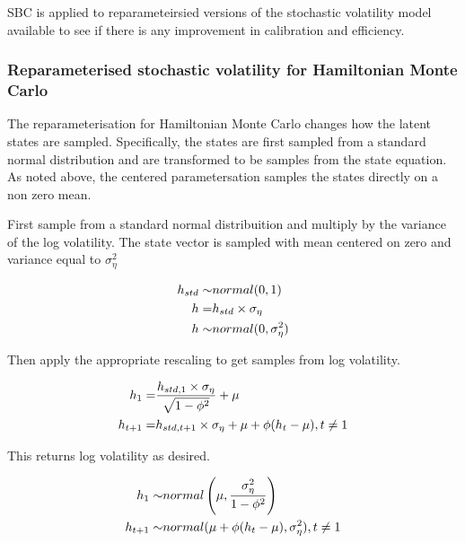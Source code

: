 \documentclass[12pt, a4paper]{article}
\begin{document}
        SBC is applied to reparameteirsied versions of the stochastic volatility model available to see if there is any improvement in calibration and efficiency. 
        
        \subsubsection{Reparameterised stochastic volatility for Hamiltonian Monte Carlo}
        The reparameterisation for Hamiltonian Monte Carlo changes how the latent states are sampled. Specifically, the states are first sampled from a standard normal distribution and are transformed to be samples from the state equation. As noted above, the centered parametersation samples the states directly on a non zero mean. 

        First sample from a standard normal distribuition and multiply by the variance of the log volatility. The state vector is sampled with mean centered on zero and variance equal to $\sigma_{\eta}^2$

        $$
        \begin{aligned}
        h_{std} \sim& \space normal(0,1) \\
        h =& h_{std} \times \sigma_{\eta} \\ 
        h \sim& normal(0, \sigma_{\eta}^2)
        \end{aligned}
        $$
        
        Then apply the appropriate rescaling to get samples from log volatility. 
        
        $$
        \begin{aligned}
        h_1 =& \space \frac{h_{std, 1}\times \sigma_{\eta}} {\sqrt{1 - \phi^2}} + \mu \\
        h_{t+1} =& \space h_{std, t+1}\times \sigma_{\eta} + \mu  + \phi(h_{t} - \mu),\space t\neq 1
        \end{aligned}
        $$
        
        This returns log volatility as desired.
        
        $$
        \begin{aligned}
        h_1 \sim& \space normal \left(\mu, \frac{\sigma_{\eta}^2}{1-\phi^2}\right) \\
        h_{t+1} \sim& \space normal(\mu +\phi(h_t - \mu) , \sigma_{\eta}^2), \space\space t\neq 1\\ 
        \end{aligned}
        $$
\end{document}
